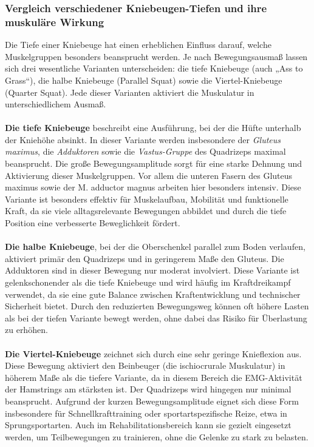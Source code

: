 \subsubsection{Vergleich verschiedener Kniebeugen-Tiefen und ihre muskuläre Wirkung}
Die Tiefe einer Kniebeuge hat einen erheblichen Einfluss darauf, welche Muskelgruppen besonders beansprucht werden. Je nach Bewegungsausmaß lassen sich drei wesentliche Varianten unterscheiden: die tiefe Kniebeuge (auch „Ass to Grass“), die halbe Kniebeuge (Parallel Squat) sowie die Viertel-Kniebeuge (Quarter Squat). Jede dieser Varianten aktiviert die Muskulatur in unterschiedlichem Ausmaß.\cite{Meinart}
\\
\\
\noindent \textbf{Die tiefe Kniebeuge} beschreibt eine Ausführung, bei der die Hüfte unterhalb der Kniehöhe absinkt. In dieser Variante werden insbesondere der \textit{Gluteus maximus}, die \textit{Adduktoren} sowie die \textit{Vastus-Gruppe} des Quadrizeps maximal beansprucht. Die große Bewegungsamplitude sorgt für eine starke Dehnung und Aktivierung dieser Muskelgruppen. Vor allem die unteren Fasern des Gluteus maximus sowie der M. adductor magnus arbeiten hier besonders intensiv. Diese Variante ist besonders effektiv für Muskelaufbau, Mobilität und funktionelle Kraft, da sie viele alltagsrelevante Bewegungen abbildet und durch die tiefe Position eine verbesserte Beweglichkeit fördert. \cite{Meinart}
\\
\\
\noindent \textbf{Die halbe Kniebeuge}, bei der die Oberschenkel parallel zum Boden verlaufen, aktiviert primär den Quadrizeps und in geringerem Maße den Gluteus. Die Adduktoren sind in dieser Bewegung nur moderat involviert. Diese Variante ist gelenkschonender als die tiefe Kniebeuge und wird häufig im Kraftdreikampf verwendet, da sie eine gute Balance zwischen Kraftentwicklung und technischer Sicherheit bietet. Durch den reduzierten Bewegungsweg können oft höhere Lasten als bei der tiefen Variante bewegt werden, ohne dabei das Risiko für Überlastung zu erhöhen. \cite{Meinart}
\\
\\
\noindent \textbf{Die Viertel-Kniebeuge} zeichnet sich durch eine sehr geringe Knieflexion aus. Diese Bewegung aktiviert den Beinbeuger (die ischiocrurale Muskulatur) in höherem Maße als die tiefere Variante, da in diesem Bereich die EMG-Aktivität der Hamstrings am stärksten ist. Der Quadrizeps wird hingegen nur minimal beansprucht. Aufgrund der kurzen Bewegungsamplitude eignet sich diese Form insbesondere für Schnellkrafttraining oder sportartspezifische Reize, etwa in Sprungsportarten. Auch im Rehabilitationsbereich kann sie gezielt eingesetzt werden, um Teilbewegungen zu trainieren, ohne die Gelenke zu stark zu belasten. \cite{Meinart}
